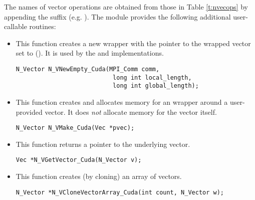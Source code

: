 The names of vector operations are obtained from those in 
Table \ref{t:nvecops} by appending the suffix  (e.g. ).
The module {\nveccuda}  provides the following additional user-callable routines:
\begin{itemize}

  

\item {}
 
  This function creates a new {\nvector} wrapper with the pointer to
  the wrapped {\cuda} vector set to (). It is used by the 
   and  implementations. 

\begin{verbatim}
N_Vector N_VNewEmpty_Cuda(MPI_Comm comm, 
                           long int local_length, 
                           long int global_length);
\end{verbatim}

  

\item {}
  
  This function creates and allocates memory for an {\nveccuda}
  wrapper around a user-provided {\cuda} vector. It does {\em not} 
  allocate memory for the vector  itself.

\begin{verbatim}
N_Vector N_VMake_Cuda(Vec *pvec);
\end{verbatim}


\item {}
  
  This function returns a pointer to the underlying {\cuda} vector.

\begin{verbatim}
Vec *N_VGetVector_Cuda(N_Vector v);
\end{verbatim}



\item {}
 
  This function creates (by cloning) an array of  {\nveccuda} vectors.
 
\begin{verbatim}
N_Vector *N_VCloneVectorArray_Cuda(int count, N_Vector w);
\end{verbatim}


\end{itemize}
